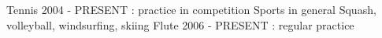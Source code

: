 

\begin{cvskills}

  \cvskill
    {Tennis} %
    {2004 - PRESENT : practice in competition} 
  \cvskill
    {Sports in general} %
    {Squash, volleyball, windsurfing, skiing} 
  \cvskill
    {Flute} %
    {2006 - PRESENT : regular practice} 
\end{cvskills}
